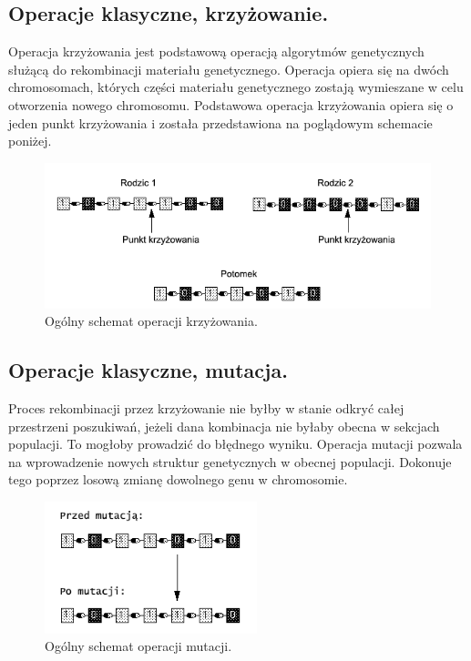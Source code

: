 \documentclass[twoside,12pt]{report}
\begin{document}
\subsection{Operacje klasyczne, krzyżowanie.}

Operacja krzyżowania jest podstawową operacją algorytmów genetycznych służącą do rekombinacji materiału genetycznego. Operacja opiera się na dwóch chromosomach, których części materiału genetycznego zostają wymieszane w celu otworzenia nowego chromosomu. Podstawowa operacja krzyżowania opiera się o jeden punkt krzyżowania i została przedstawiona na poglądowym schemacie poniżej\cite{gene-mutikrzyz}.

\begin{figure}[ht]
\begin{center}
\includegraphics[width=\textwidth]{img/crossover}
\caption{Ogólny schemat operacji krzyżowania.}
\end{center}
\end{figure}

\subsection{Operacje klasyczne, mutacja.}

Proces rekombinacji przez krzyżowanie nie byłby w stanie odkryć całej przestrzeni poszukiwań, jeżeli dana kombinacja nie byłaby obecna w sekcjach populacji. To mogłoby prowadzić do błędnego wyniku. Operacja mutacji pozwala na wprowadzenie nowych struktur genetycznych w obecnej populacji. Dokonuje tego poprzez losową zmianę dowolnego genu w chromosomie\cite{gene-mutikrzyz}.

\begin{figure}[ht]
\begin{center}
\includegraphics[width=0.55\textwidth]{img/mutation}
\caption{Ogólny schemat operacji mutacji.}
\end{center}
\end{figure}
\end{document}
